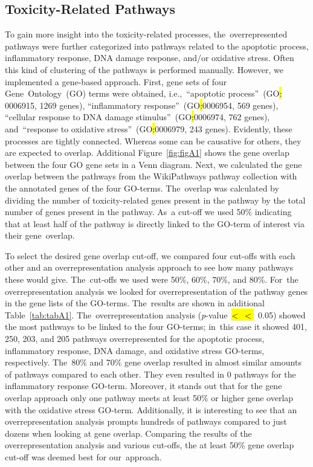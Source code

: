 \documentclass[ijms,article,accept,moreauthors,pdftex]{Definitions/mdpi}
\begin{document}
\begin{paracol}{2}
\subsection{Toxicity-Related Pathways}
To gain more insight into the toxicity-related processes, the~overrepresented pathways were further categorized into pathways related to the apoptotic process, inflammatory response, DNA damage response, and/or oxidative stress. Often this kind of clustering of the pathways is performed manually. However, we implemented a gene-based approach. First, gene sets of four Gene~Ontology~(GO) terms were obtained, i.e.,~“apoptotic process”~(GO\hl{:}%
0006915, 1269 genes), “inflammatory response”~(GO\hl{:}0006954, 569 genes),  “cellular response to DNA damage stimulus”~(GO\hl{:}0006974, 762 genes), and~“response to oxidative stress”~(GO\hl{:}0006979, 243 genes). Evidently, these processes are tightly connected. Whereas some can be causative for others, they are expected to overlap. Additional Figure~\ref{fig:figA1} shows the gene overlap between the four GO gene sets in a Venn diagram. Next, we calculated the gene overlap between the pathways from the WikiPathways pathway collection with the annotated genes of the four GO-terms. The~overlap was calculated by dividing the number of toxicity-related genes present in the pathway by the total number of genes present in the pathway. As~a cut-off we used 50$\%$ indicating that at least half of the pathway is directly linked to the GO-term of interest via their gene~overlap.

To select the desired gene overlap cut-off, we compared four cut-offs with each other and an overrepresentation analysis approach to see how many pathways these would give. The~cut-offs we used were 50\%, 60\%, 70\%, and 80\%. For~the overrepresentation analysis we looked for overrepresentation of the pathway genes in the gene lists of the GO-terms. The~results are shown in additional Table~\ref{tab:tabA1}. The~overrepresentation analysis \mbox{(\emph{p}-value~\hl{< $<$}~0.05)} %
showed the most pathways to be linked to the four GO-terms; in~this case it showed 401, 250, 203, and 205 pathways overrepresented for the apoptotic process, inflammatory response, DNA damage, and oxidative stress GO-terms, respectively. The~80\% and 70\% gene overlap resulted in almost similar amounts of pathways compared to each other. They even resulted in 0 pathways for the inflammatory response GO-term. Moreover, it stands out that for the gene overlap approach only one pathway meets at least 50\% or higher gene overlap with the oxidative stress GO-term. Additionally, it is interesting to see that an overrepresentation analysis prompts hundreds of pathways compared to just dozens when looking at gene overlap. Comparing the results of the overrepresentation analysis and various cut-offs, the at least 50\% gene overlap cut-off was deemed best for our~approach. 


\end{paracol}
\end{document}
